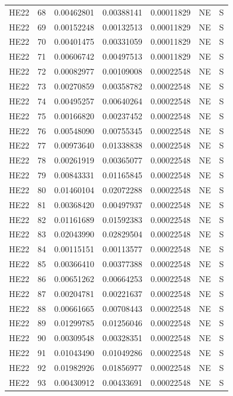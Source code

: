 \documentclass[11pt]{article}
\begin{document}
{\begin{longtable}{llrrrll}
HE22 & 68 & 0.00462801 & 0.00388141 & 0.00011829 & NE & S\\
HE22 & 69 & 0.00152248 & 0.00132513 & 0.00011829 & NE & S\\
HE22 & 70 & 0.00401475 & 0.00331059 & 0.00011829 & NE & S\\
HE22 & 71 & 0.00606742 & 0.00497513 & 0.00011829 & NE & S\\
HE22 & 72 & 0.00082977 & 0.00109008 & 0.00022548 & NE & S\\
HE22 & 73 & 0.00270859 & 0.00358782 & 0.00022548 & NE & S\\
HE22 & 74 & 0.00495257 & 0.00640264 & 0.00022548 & NE & S\\
HE22 & 75 & 0.00166820 & 0.00237452 & 0.00022548 & NE & S\\
HE22 & 76 & 0.00548090 & 0.00755345 & 0.00022548 & NE & S\\
HE22 & 77 & 0.00973640 & 0.01338838 & 0.00022548 & NE & S\\
HE22 & 78 & 0.00261919 & 0.00365077 & 0.00022548 & NE & S\\
HE22 & 79 & 0.00843331 & 0.01165845 & 0.00022548 & NE & S\\
HE22 & 80 & 0.01460104 & 0.02072288 & 0.00022548 & NE & S\\
HE22 & 81 & 0.00368420 & 0.00497937 & 0.00022548 & NE & S\\
HE22 & 82 & 0.01161689 & 0.01592383 & 0.00022548 & NE & S\\
HE22 & 83 & 0.02043990 & 0.02829504 & 0.00022548 & NE & S\\
HE22 & 84 & 0.00115151 & 0.00113577 & 0.00022548 & NE & S\\
HE22 & 85 & 0.00366410 & 0.00377388 & 0.00022548 & NE & S\\
HE22 & 86 & 0.00651262 & 0.00664253 & 0.00022548 & NE & S\\
HE22 & 87 & 0.00204781 & 0.00221637 & 0.00022548 & NE & S\\
HE22 & 88 & 0.00661665 & 0.00708443 & 0.00022548 & NE & S\\
HE22 & 89 & 0.01299785 & 0.01256046 & 0.00022548 & NE & S\\
HE22 & 90 & 0.00309548 & 0.00328351 & 0.00022548 & NE & S\\
HE22 & 91 & 0.01043490 & 0.01049286 & 0.00022548 & NE & S\\
HE22 & 92 & 0.01982926 & 0.01856977 & 0.00022548 & NE & S\\
HE22 & 93 & 0.00430912 & 0.00433691 & 0.00022548 & NE & S\\

\end{longtable}}
\end{document}

